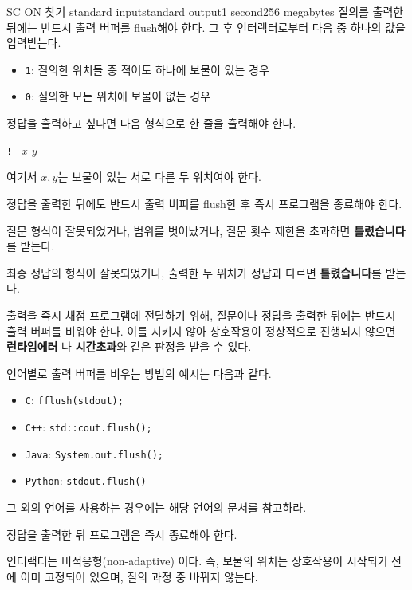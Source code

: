 \begin{problem}{SC ON 찾기 }{standard input}{standard output}{1 second}{256 megabytes}
질의를 출력한 뒤에는 반드시 출력 버퍼를 flush해야 한다.
그 후 인터랙터로부터 다음 중 하나의 값을 입력받는다.
\begin{itemize}
\item \texttt{1}: 질의한 위치들 중 적어도 하나에 보물이 있는 경우
\item \texttt{0}: 질의한 모든 위치에 보물이 없는 경우
\end{itemize}

정답을 출력하고 싶다면 다음 형식으로 한 줄을 출력해야 한다.
\begin{center}
\texttt{! } $x$ $y$
\end{center}

여기서 $x, y$는 보물이 있는 서로 다른 두 위치여야 한다.

정답을 출력한 뒤에도 반드시 출력 버퍼를 flush한 후 즉시 프로그램을 종료해야 한다.

질문 형식이 잘못되었거나, 범위를 벗어났거나, 질문 횟수 제한을 초과하면 \textbf{틀렸습니다}를 받는다.

최종 정답의 형식이 잘못되었거나, 출력한 두 위치가 정답과 다르면 \textbf{틀렸습니다}를 받는다.

출력을 즉시 채점 프로그램에 전달하기 위해, 질문이나 정답을 출력한 뒤에는 반드시 출력 버퍼를 비워야 한다.
이를 지키지 않아 상호작용이 정상적으로 진행되지 않으면 \textbf{런타임에러} 나 \textbf{시간초과}와 같은 판정을 받을 수 있다.

언어별로 출력 버퍼를 비우는 방법의 예시는 다음과 같다.

\begin{itemize}
    \item \texttt{C}: \texttt{fflush(stdout);}
    \item \texttt{C++}: \texttt{std::cout.flush();}
    \item \texttt{Java}: \texttt{System.out.flush();}
    \item \texttt{Python}: \texttt{stdout.flush()}
\end{itemize}

그 외의 언어를 사용하는 경우에는 해당 언어의 문서를 참고하라.

정답을 출력한 뒤 프로그램은 즉시 종료해야 한다.

\Example

\begin{example}
%
\end{example}

\Note
인터랙터는 비적응형(non-adaptive) 이다.
즉, 보물의 위치는 상호작용이 시작되기 전에 이미 고정되어 있으며, 질의 과정 중 바뀌지 않는다.

\end{problem}

